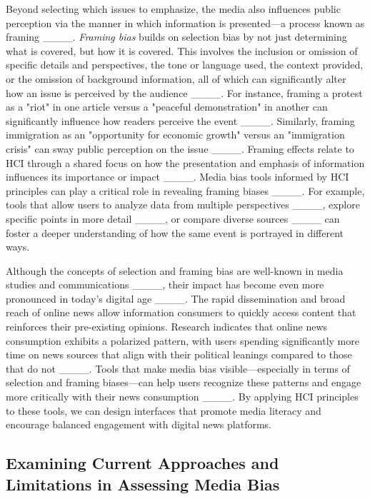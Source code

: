 Beyond selecting which issues to emphasize, the media also influences public perception via the manner in which information is presented---a process known as framing ____. \emph{Framing bias} builds on selection bias by not just determining what is covered, but how it is covered. This involves the inclusion or omission of specific details and perspectives, the tone or language used, the context provided, or the omission of background information, all of which can significantly alter how an issue is perceived by the audience ____. For instance, framing a protest as a "riot" in one article versus a "peaceful demonstration" in another can significantly influence how readers perceive the event ____. Similarly, framing immigration as an "opportunity for economic growth" versus an "immigration crisis" can sway public perception on the issue ____. Framing effects relate to HCI through a shared focus on how the presentation and emphasis of information influences its importance or impact ____. Media bias tools informed by HCI principles can play a critical role in revealing framing biases ____. For example, tools that allow users to analyze data from multiple perspectives ____, explore specific points in more detail ____, or compare diverse sources ____ can foster a deeper understanding of how the same event is portrayed in different ways.

Although the concepts of selection and framing bias are well-known in media studies and communications ____, their impact has become even more pronounced in today's digital age ____. The rapid dissemination and broad reach of online news allow information consumers to quickly access content that reinforces their pre-existing opinions. Research indicates that online news consumption exhibits a polarized pattern, with users spending significantly more time on news sources that align with their political leanings compared to those that do not ____. Tools that make media bias visible---especially in terms of selection and framing biases---can help users recognize these patterns and engage more critically with their news consumption ____. By applying HCI principles to these tools, we can design interfaces that promote media literacy and encourage balanced engagement with digital news platforms.

\subsection{Examining Current Approaches and Limitations in Assessing Media Bias}
\label{sec:related_work_existing_tools}

